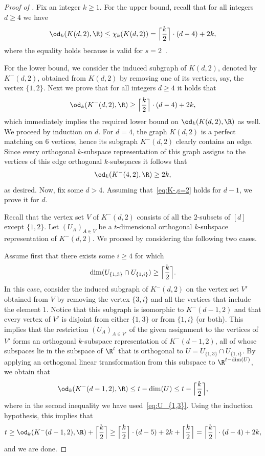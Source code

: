\begin{proof}[Proof of ]
Fix an integer $k \geq 1$.
For the upper bound, recall that for all integers $d \geq 4$ we have
\[\od_{k}(K(d,2),\R) \leq \chi_k(K(d,2)) = \Big \lceil \frac{k}{2} \Big \rceil \cdot (d-4)+2k,\]
where the equality holds because  is valid for $s=2$~\cite{Stahl98}.

For the lower bound, we consider the induced subgraph of $K(d,2)$, denoted by $K^{-}(d,2)$, obtained from $K(d,2)$ by removing one of its vertices, say, the vertex $\{1,2\}$.
%
Next we prove  %
that for all integers $d \geq 4$ it holds that
\begin{eqnarray}\label{eq:K-,s=2}
\od_{k}(K^{-}(d,2),\R) \geq \Big \lceil \frac{k}{2} \Big \rceil \cdot (d-4)+2k,
\end{eqnarray}
which immediately implies the required lower bound on $\od_{k}(K(d,2),\R)$ as well.
%
We proceed by  %
induction on $d$.
For $d=4$, the graph $K(d,2)$ is a perfect matching on $6$ vertices, hence its subgraph $K^{-}(d,2)$ clearly contains an edge. Since every orthogonal $k$-subspace representation of this graph assigns to the vertices of this edge orthogonal $k$-subspaces it follows that \[\od_k(K^{-}(4,2),\R) \geq 2k,\]
as desired.
Now, fix some $d > 4$. Assuming that~\eqref{eq:K-,s=2} holds for $d-1$,
we %
prove it for $d$.

Recall that the vertex set $V$ of $K^{-}(d,2)$ consists of all the $2$-subsets of $[d]$ except $\{1,2\}$.
Let $(U_A)_{A \in V}$ be a $t$-dimensional orthogonal $k$-subspace representation of $K^{-}(d,2)$.
We proceed by considering the following two cases.

Assume first that there exists some $i \geq 4$ for which
\begin{eqnarray}\label{eq:U_{1,3}}
\dim(U_{\{1,3\}} \cap U_{\{1,i\}}) \geq \Big\lceil \frac{k}{2} \Big\rceil.
\end{eqnarray}
In this case, consider the induced subgraph of $K^{-}(d,2)$ on the vertex set $V'$ obtained from $V$ by removing the vertex $\{3,i\}$ and all the vertices that include the element $1$.
Notice that this subgraph is isomorphic to $K^{-}(d-1,2)$ and that every vertex of $V'$ is disjoint from either $\{1,3\}$ or from $\{1,i\}$ (or both).
This implies that the restriction $(U_A)_{A \in V'}$ of the given assignment to the vertices of $V'$ forms an orthogonal $k$-subspace representation of $K^{-}(d-1,2)$, all of whose subspaces lie in the subspace of $\R^t$ that is orthogonal to $U = U_{\{1,3\}} \cap U_{\{1,i\}}$.
By applying an orthogonal linear transformation from this subspace to $\R^{t-\dim(U)}$, we obtain that
\[ \od_k(K^{-}(d-1,2),\R) \leq t- \dim(U) \leq t- \Big\lceil \frac{k}{2} \Big\rceil,\]
where in the second inequality we have used~\eqref{eq:U_{1,3}}.
Using the induction hypothesis, this implies that
\[ t \geq \od_k(K^{-}(d-1,2),\R) + \Big\lceil \frac{k}{2} \Big\rceil \geq \Big \lceil \frac{k}{2} \Big \rceil \cdot (d-5)+2k + \Big\lceil \frac{k}{2} \Big\rceil = \Big \lceil \frac{k}{2} \Big \rceil \cdot (d-4)+2k,\]
and we are done.


\end{proof}
